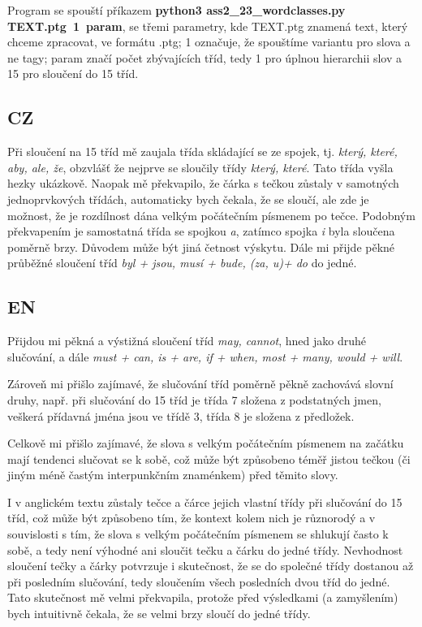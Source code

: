 \documentclass[12pt, a4paper]{report}
\theoremstyle{remark}
\begin{document}
Program se spouští příkazem {\bf python3 ass2\_23\_wordclasses.py TEXT.ptg~1~param}, se třemi parametry, kde TEXT.ptg znamená text, který chceme zpracovat, ve formátu .ptg; 1 označuje, že spouštíme variantu pro slova a ne tagy; param značí počet zbývajících tříd, tedy 1 pro úplnou hierarchii slov a 15 pro sloučení do 15 tříd. 

\subsection*{CZ}
Při sloučení na 15 tříd mě zaujala třída skládající se ze spojek, tj. {\it  který, které, aby, ale, že}, obzvlášť že nejprve se sloučily třídy {\it který, které}. Tato třída vyšla hezky ukázkově. Naopak mě překvapilo, že čárka s tečkou zůstaly v samotných jednoprvkových třídách, automaticky bych čekala, že se sloučí, ale zde je možnost, že je rozdílnost dána velkým počátečním písmenem po tečce. Podobným překvapením je samostatná třída se spojkou {\it a}, zatímco spojka {\it i} byla sloučena poměrně brzy. Důvodem může být jiná četnost výskytu. Dále mi přijde pěkné průběžné sloučení tříd {\it byl + jsou, musí + bude, (za, u)+ do} do jedné.


\subsection*{EN}

Přijdou mi pěkná a výstižná sloučení tříd {\it may, cannot}, hned jako druhé slučování,  a dále  {\it must + can, is + are, if + when, most + many, would + will}.

Zároveň mi přišlo zajímavé, že slučování tříd poměrně pěkně zachovává slovní druhy, např. při slučování do 15 tříd je třída 7 složena  z podstatných jmen, veškerá přídavná jména jsou ve třídě 3, třída 8 je složena z předložek.

Celkově mi přišlo zajímavé, že slova s velkým počátečním písmenem na začátku mají tendenci slučovat se k sobě, což může být způsobeno téměř jistou tečkou (či jiným méně častým interpunkčním znaménkem) před těmito slovy.

I v anglickém textu zůstaly tečce a čárce jejich vlastní třídy při slučování do 15 tříd, což může být způsobeno tím, že kontext kolem nich je různorodý a v souvislosti s tím, že slova s velkým počátečním písmenem se shlukují často k sobě, a tedy není výhodné ani sloučit tečku a čárku do jedné třídy. Nevhodnost sloučení tečky a čárky potvrzuje i skutečnost, že se do společné třídy dostanou až při posledním slučování, tedy sloučením všech posledních dvou tříd do jedné. Tato skutečnost mě velmi překvapila, protože před výsledkami (a zamyšlením) bych intuitivně čekala, že se velmi brzy sloučí do jedné třídy.
\end{document}
